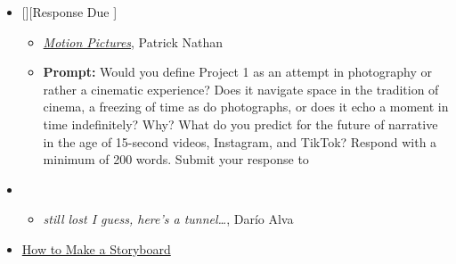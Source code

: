 \begin{itemize}[noitemsep,topsep=0pt,leftmargin=*]
    \item {}[][Response Due \dThur]
          \begin{itemize}
              \item \href{https://reallifemag.com/motion-pictures/}{\emph{Motion Pictures}}, Patrick Nathan
              \item \textbf{Prompt:} Would you define Project 1 as an attempt in photography or rather a cinematic experience? Does it navigate space in the tradition of cinema, a freezing of time as do photographs, or does it echo a moment in time indefinitely? Why? What do you predict for the future of narrative in the age of 15-second videos, Instagram, and TikTok? Respond with a minimum of 200 words. Submit your response to \discordR
          \end{itemize}
    \item {}
          \begin{itemize}
              \item \emph{still lost I guess, here’s a tunnel\dots}, Darío Alva
          \end{itemize}
    \item {} \href{https://www.studiobinder.com/blog/how-to-make-storyboard/}{How to Make a Storyboard}
\end{itemize}